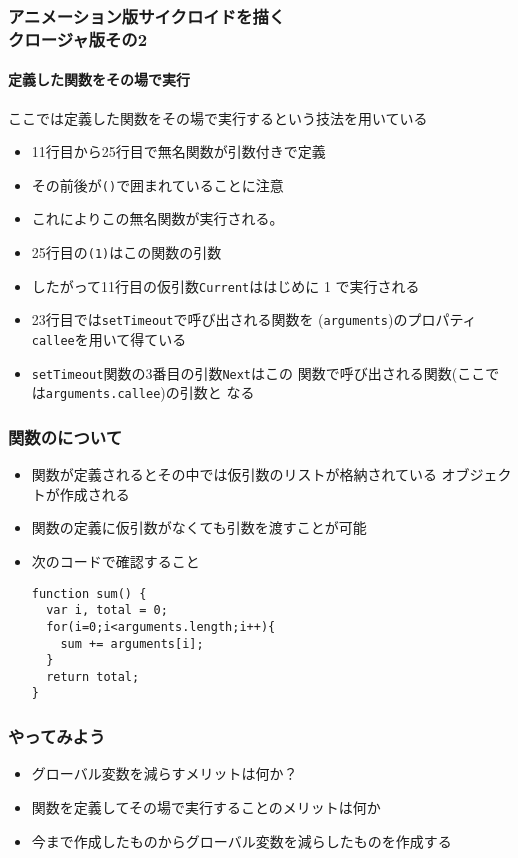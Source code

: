 \begin{frame}[containsverbatim]
 \frametitle{アニメーション版サイクロイドを描く\\クロージャ版その2}
 \framesubtitle{定義した関数をその場で実行}
 ここでは定義した関数をその場で実行するという技法を用いている
 \begin{itemize}
	\item 11行目から25行目で無名関数が引数付きで定義
	\item その前後が\Verb+()+で囲まれていることに注意
	\item これによりこの無名関数が実行される。
	\item 25行目の\Verb+(1)+はこの関数の引数
	\item したがって11行目の仮引数\Verb+Current+ははじめに 1 で実行される
	\item 23行目では\Verb+setTimeout+で呼び出される関数を
				(\Verb+arguments+)のプロパティ\Verb+callee+を用いて得ている
	\item \Verb+setTimeout+関数の3番目の引数\Verb+Next+はこの%
				関数で呼び出される関数(ここでは\Verb+arguments.callee+)の引数と
				なる
 \end{itemize}
\end{frame}
\begin{frame}[containsverbatim]
 \frametitle{関数のについて}
 \begin{itemize}
	\item 関数が定義されるとその中では仮引数のリストが格納されている
				オブジェクトが作成される
	\item 関数の定義に仮引数がなくても引数を渡すことが可能
	\item 次のコードで確認すること

\begin{Verbatim}
function sum() {
  var i, total = 0;
  for(i=0;i<arguments.length;i++){
    sum += arguments[i];
  }
  return total;
}
\end{Verbatim}
 \end{itemize}
\end{frame}
\begin{frame}[containsverbatim]
 \frametitle{やってみよう}
 \begin{itemize}
	\item グローバル変数を減らすメリットは何か？
	\item 関数を定義してその場で実行することのメリットは何か
	\item 今まで作成したものからグローバル変数を減らしたものを作成する
 \end{itemize}
\end{frame}


\begin{frame}[containsverbatim]
 \frametitle{}
\end{frame}
